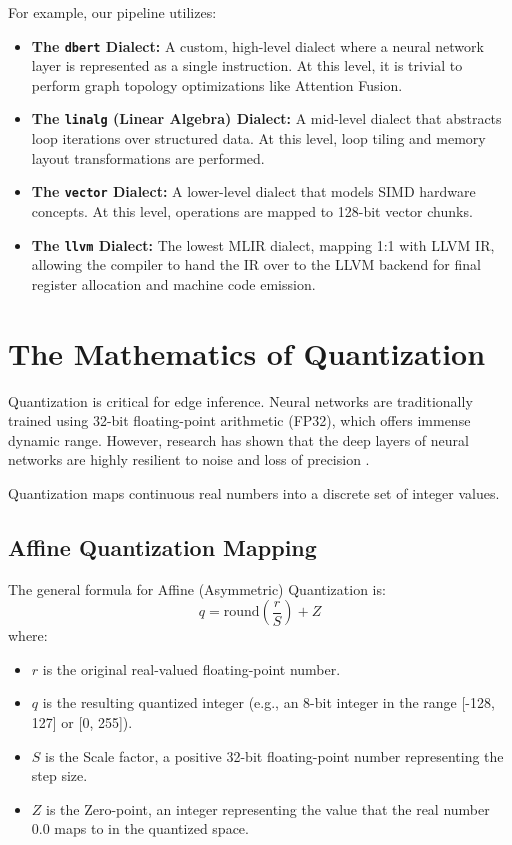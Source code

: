 For example, our pipeline utilizes:
\begin{itemize}
    \item \textbf{The \texttt{dbert} Dialect:} A custom, high-level dialect where a neural network layer is represented as a single instruction. At this level, it is trivial to perform graph topology optimizations like Attention Fusion.
    \item \textbf{The \texttt{linalg} (Linear Algebra) Dialect:} A mid-level dialect that abstracts loop iterations over structured data. At this level, loop tiling and memory layout transformations are performed.
    \item \textbf{The \texttt{vector} Dialect:} A lower-level dialect that models SIMD hardware concepts. At this level, operations are mapped to 128-bit vector chunks.
    \item \textbf{The \texttt{llvm} Dialect:} The lowest MLIR dialect, mapping 1:1 with LLVM IR, allowing the compiler to hand the IR over to the LLVM backend for final register allocation and machine code emission.
\end{itemize}

\section{The Mathematics of Quantization}
Quantization is critical for edge inference. Neural networks are traditionally trained using 32-bit floating-point arithmetic (FP32), which offers immense dynamic range. However, research has shown that the deep layers of neural networks are highly resilient to noise and loss of precision \cite{jacob2018quantization}.

Quantization maps continuous real numbers into a discrete set of integer values. 

\subsection{Affine Quantization Mapping}
The general formula for Affine (Asymmetric) Quantization is:
\begin{equation}
q = \text{round}\left(\frac{r}{S}\right) + Z
\end{equation}
where:
\begin{itemize}
    \item $r$ is the original real-valued floating-point number.
    \item $q$ is the resulting quantized integer (e.g., an 8-bit integer in the range [-128, 127] or [0, 255]).
    \item $S$ is the Scale factor, a positive 32-bit floating-point number representing the step size.
    \item $Z$ is the Zero-point, an integer representing the value that the real number $0.0$ maps to in the quantized space.
\end{itemize}

